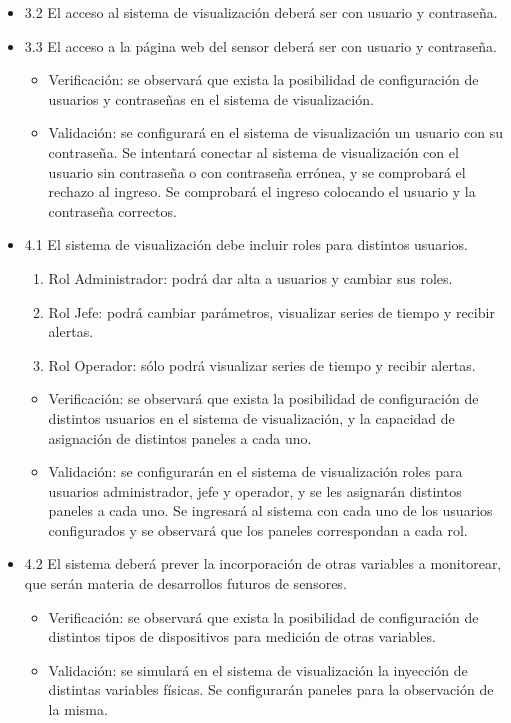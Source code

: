 \documentclass[11pt]{charter}
\begin{document}
\begin{itemize}
\item 3.2 El acceso al sistema de visualización deberá ser con usuario y contraseña.
\item 3.3 El acceso a la página web del sensor deberá ser con usuario y contraseña.
\begin{itemize}
\item Verificación: se observará que exista la posibilidad de configuración de usuarios y contraseñas en el sistema de visualización.
\item Validación: se configurará en el sistema de visualización un usuario con su contraseña. Se intentará conectar al sistema de visualización con el usuario sin contraseña o con contraseña errónea, y se comprobará el rechazo al ingreso. Se comprobará el ingreso colocando el usuario y la contraseña correctos.
\end{itemize}

\item 4.1 El sistema de visualización debe incluir roles para distintos usuarios.
		 \begin{enumerate}
		 \item Rol Administrador: podrá dar alta a usuarios y cambiar sus roles.
	     \item Rol Jefe: podrá cambiar parámetros, visualizar series de tiempo y recibir alertas.
	     \item Rol Operador: sólo podrá visualizar series de tiempo y recibir alertas.
	     \end{enumerate}
\begin{itemize}
\item Verificación: se observará que exista la posibilidad de configuración de distintos usuarios en el sistema de visualización, y la capacidad de asignación de distintos paneles a cada uno. 
\item Validación: se configurarán en el sistema de visualización roles para usuarios administrador, jefe y operador, y se les asignarán distintos paneles a cada uno. Se ingresará al sistema con cada uno de los usuarios configurados y se observará que los paneles correspondan a cada rol.
\end{itemize}
	     
\item 4.2 El sistema deberá prever la incorporación de otras variables a monitorear, que serán materia de desarrollos futuros de sensores.
\begin{itemize}
\item Verificación: se observará que exista la posibilidad de configuración de distintos tipos de dispositivos para medición de otras variables. 
\item Validación: se simulará en el sistema de visualización la inyección de distintas variables físicas. Se configurarán paneles para la observación de la misma.
\end{itemize}


\end{itemize}
\end{document}
